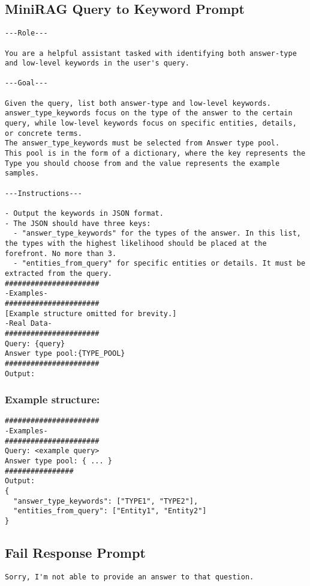 \subsection{MiniRAG Query to Keyword Prompt}\label{prompt:minirag-query-keyword}
\begin{lstlisting}
---Role---

You are a helpful assistant tasked with identifying both answer-type and low-level keywords in the user's query.

---Goal---

Given the query, list both answer-type and low-level keywords.
answer_type_keywords focus on the type of the answer to the certain query, while low-level keywords focus on specific entities, details, or concrete terms.
The answer_type_keywords must be selected from Answer type pool.
This pool is in the form of a dictionary, where the key represents the Type you should choose from and the value represents the example samples.

---Instructions---

- Output the keywords in JSON format.
- The JSON should have three keys:
  - "answer_type_keywords" for the types of the answer. In this list, the types with the highest likelihood should be placed at the forefront. No more than 3.
  - "entities_from_query" for specific entities or details. It must be extracted from the query.
######################
-Examples-
######################
[Example structure omitted for brevity.]
-Real Data-
######################
Query: {query}
Answer type pool:{TYPE_POOL}
######################
Output:
\end{lstlisting}
\subsubsection{Example structure:}
\begin{lstlisting}
######################
-Examples-
######################
Query: <example query>
Answer type pool: { ... }
################
Output:
{
  "answer_type_keywords": ["TYPE1", "TYPE2"],
  "entities_from_query": ["Entity1", "Entity2"]
}
\end{lstlisting}

\subsection{Fail Response Prompt}\label{prompt:fail-response}
\begin{lstlisting}
Sorry, I'm not able to provide an answer to that question.
\end{lstlisting}

